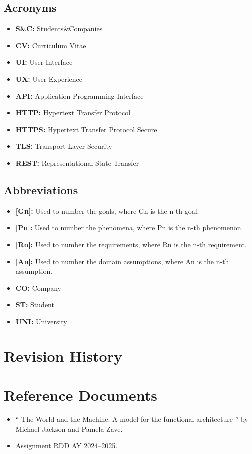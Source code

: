\subsection{Acronyms}\label{subsec:acronyms}
\begin{itemize}
    \item \textbf{S\&C:} Students\&Companies
    \item \textbf{CV:} Curriculum Vitae
    \item \textbf{UI:} User Interface
    \item \textbf{UX:} User Experience
    \item \textbf{API:} Application Programming Interface
    \item \textbf{HTTP:} Hypertext Transfer Protocol
    \item \textbf{HTTPS:} Hypertext Transfer Protocol Secure
    \item \textbf{TLS:} Transport Layer Security
    \item \textbf{REST:} Representational State Transfer

\end{itemize}

\subsection{Abbreviations}\label{subsec:abbreviations}
\begin{itemize}
    \item \textbf{[Gn]:} Used to number the goals, where Gn is the n-th goal.
    \item \textbf{[Pn]:} Used to number the phenomena, where Pn is the n-th phenomenon.
    \item \textbf{[Rn]:} Used to number the requirements, where Rn is the n-th requirement.
    \item \textbf{[An]:} Used to number the domain assumptions, where An is the n-th assumption.
    \item \textbf{CO:} Company
    \item \textbf{ST:} Student
    \item \textbf{UNI:} University
\end{itemize}

\section{Revision History}\label{sec:revisionhistory}

\section{Reference Documents}\label{sec:reference}
\begin{itemize}
    \item `` The World and the Machine: A model for the functional architecture '' by Michael Jackson and Pamela Zave.
    \item Assignment RDD AY 2024–2025.
\end{itemize}

